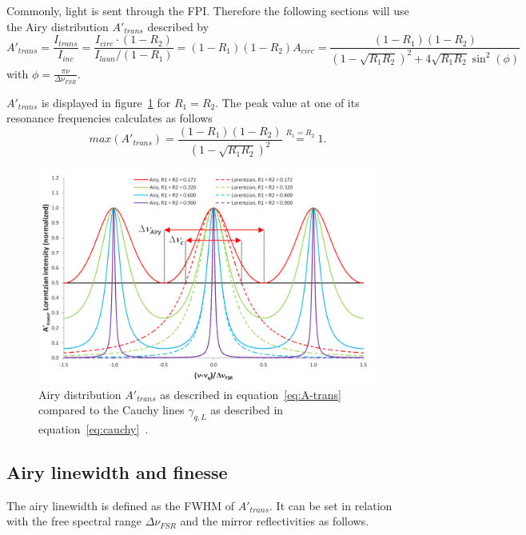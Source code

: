 Commonly, light is sent through the \ac{FPI}. Therefore the following sections will use the Airy distribution $A'_{trans}$ described by
\begin{equation}
\label{eq:A-trans}
A'_{trans} = \frac{I_{trans}}{I_{inc}} = \frac{I_{circ} \cdot (1 - R_2)}{I_{laun} / (1 - R_1)} = (1-R_1)(1-R_2)A_{circ} = \frac{(1-R_1)(1-R_2)}{\left(1-\sqrt{R_1R_2}\right)^2+4\sqrt{R_1R_2}\sin^2(\phi)}
\end{equation}
with $\phi=\frac{\pi\nu}{\Delta \nu_{FSR}}$.

$A'_{trans}$ is displayed in figure~\ref{fig:airydistributionofafabry-perotinterferometer} for $R_1=R_2$. The peak value at one of its resonance frequencies calculates as follows
\begin{equation}
max(A'_{trans}) = \frac{(1-R_1)(1-R_2)}{\left(1-\sqrt{R_1R_2}\right)^2} \stackrel{R_1=R_2}{=} 1.
\end{equation}

\begin{figure}[h]
	\centering
	\includegraphics[width=0.8\linewidth]{figures/fabry-perot/Airy_distribution_of_a_Fabry-Perot_interferometer}
	\caption[Airy distribution $A'_{trans}$]{Airy distribution $A'_{trans}$ as described in equation~\eqref{eq:A-trans} compared to the Cauchy lines  $\gamma_{q,L}$ as described in equation~\eqref{eq:cauchy}~\cite{noauthor_fabryperot_nodate}.}
	\label{fig:airydistributionofafabry-perotinterferometer}
\end{figure}


\subsection{Airy linewidth and finesse}
The airy linewidth is defined as the \ac{FWHM} of $A'_{trans}$. It can be set in relation with the free spectral range $\Delta \nu_{FSR}$ and the mirror reflectivities as follows.

